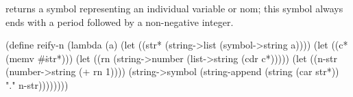  returns a symbol representing an individual
variable or nom; this symbol always ends with a period 
followed by a non-negative integer. 

\schemedisplayspace
\begin{schemedisplay}
(define reify-n
  (lambda (a)
    (let ((str* (string->list (symbol->string a))))
      (let ((c* (memv #\. str*)))
        (let ((rn (string->number (list->string (cdr c*)))))
          (let ((n-str (number->string (+ rn 1))))
            (string->symbol 
              (string-append
                (string (car str*)) "." n-str))))))))
\end{schemedisplay}








